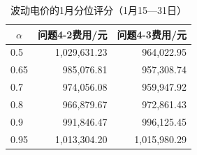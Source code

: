 \par
\begin{table}[!htbp]
\centering
\caption{波动电价的1月分位评分（1月15—31日）}\label{tab:q4-calibration}
\normalsize
\begin{tabular}{lrr}
\toprule
\multicolumn{1}{c}{$\alpha$} & \multicolumn{1}{c}{问题4-2费用/元} & \multicolumn{1}{c}{问题4-3费用/元} \\
\midrule
0.5 & 1,029,631.23 & 964,022.95 \\
0.65 & 985,076.81 & 957,308.74 \\
0.7 & 974,056.08 & 959,947.92 \\
0.8 & 966,879.67 & 972,861.43 \\
0.9 & 991,846.47 & 996,125.45 \\
0.95 & 1,013,304.20 & 1,015,980.29 \\
\bottomrule
\end{tabular}
\end{table}
\par
